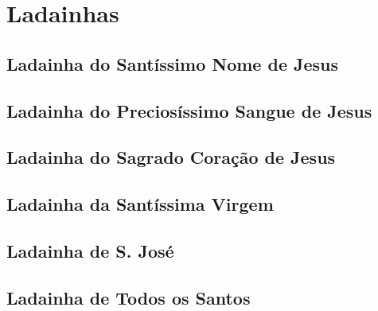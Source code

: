 \section{Ladainhas}

\subsection{Ladainha do Santíssimo Nome de Jesus}\label{ladainhanomejesus}


\subsection{Ladainha do Preciosíssimo Sangue de Jesus}\label{ladainhasanguejesus}


\subsection{Ladainha do Sagrado Coração de Jesus}\label{ladainhacoracaojesus}


\begin{nscenter}
\end{nscenter}

\subsection{Ladainha da Santíssima Virgem}\label{ladainhaloreto}


\subsection{Ladainha de S. José}\label{ladainhajose}


\subsection{Ladainha de Todos os Santos}\label{ladainhasantos}

